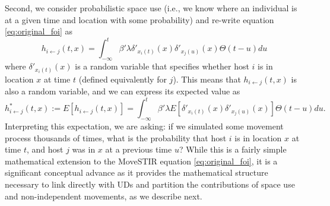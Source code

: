 ﻿\documentclass[11pt]{article}
\begin{document}
Second, we consider probabilistic space use (i.e., we know where an individual is at a given time and location with some probability) and re-write equation \ref{eq:original_foi} as
\begin{equation}
    h_{i \leftarrow j}(t, x) = \int_{-\infty}^{t} \beta' \lambda \delta'_{x_i(t)}(x) \delta'_{x_j(u)}(x) \Theta(t - u) du
    \label{eq:prob_foi}
\end{equation}
where $\delta'_{x_i(t)}(x)$ is a random variable that specifies whether host $i$ is in location $x$ at time $t$ (defined equivalently for $j$).  This means that $h_{i \leftarrow j}(t, x)$ is also a random variable, and we can express its expected value as 
\begin{equation}
    h^*_{i \leftarrow j}(t, x) := E[h_{i \leftarrow j}(t, x)] = \int_{-\infty}^{t} \beta' \lambda E[\delta'_{x_i(t)}(x) \delta'_{x_j(u)}(x)] \Theta(t - u) du.
    \label{eq:expected_foi}
\end{equation}
Interpreting this expectation, we are asking: if we simulated some movement process thousands of times, what is the probability that host $i$ is in location $x$ at time $t$, and host $j$ was in $x$ at a previous time $u$?  While this is a fairly simple mathematical extension to the MoveSTIR equation \ref{eq:original_foi}, it is a significant conceptual advance as it provides the mathematical structure necessary to link directly with UDs and partition the contributions of space use and non-independent movements, as we describe next.
\end{document}
